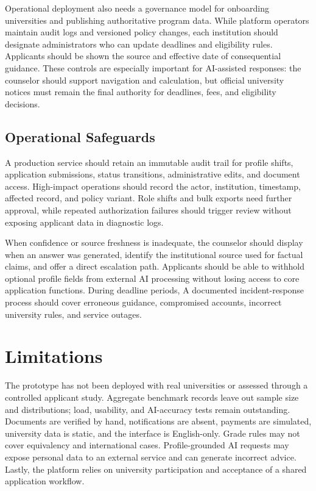 \documentclass[conference,letterpaper]{IEEEtran}
\begin{document}
Operational deployment also needs a governance model for onboarding universities and publishing authoritative program data. While platform operators maintain audit logs and versioned policy changes, each institution should designate administrators who can update deadlines and eligibility rules. Applicants should be shown the source and effective date of consequential guidance. These controls are especially important for AI-assisted responses: the counselor should support navigation and calculation, but official university notices must remain the final authority for deadlines, fees, and eligibility decisions.

\subsection{Operational Safeguards}
A production service should retain an immutable audit trail for profile shifts, application submissions, status transitions, administrative edits, and document access. High-impact operations should record the actor, institution, timestamp, affected record, and policy variant. Role shifts and bulk exports need further approval, while repeated authorization failures should trigger review without exposing applicant data in diagnostic logs.

When confidence or source freshness is inadequate, the counselor should display when an answer was generated, identify the institutional source used for factual claims, and offer a direct escalation path. Applicants should be able to withhold optional profile fields from external AI processing without losing access to core application functions. During deadline periods, A documented incident-response process should cover erroneous guidance, compromised accounts, incorrect university rules, and service outages.

\section{Limitations}
The prototype has not been deployed with real universities or assessed through a controlled applicant study. Aggregate benchmark records leave out sample size and distributions; load, usability, and AI-accuracy tests remain outstanding. Documents are verified by hand, notifications are absent, payments are simulated, university data is static, and the interface is English-only. Grade rules may not cover equivalency and international cases. Profile-grounded AI requests may expose personal data to an external service and can generate incorrect advice. Lastly, the platform relies on university participation and acceptance of a shared application workflow.
\end{document}

